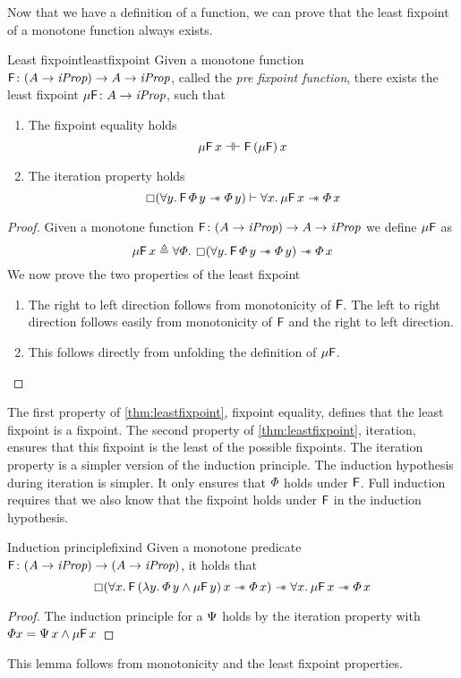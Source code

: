 \documentclass[thesis.tex]{subfiles}
\begin{document}
Now that we have a definition of a function, we can prove that the least fixpoint of a monotone function always exists.
\begin{theorem}{Least fixpoint}{leastfixpoint}
    Given a monotone function $\textsf{\upshape F}\colon (A \to \textit{iProp}) \to  A \to \textit{iProp}$, called the \emph{pre fixpoint function}, there exists the least fixpoint $\mu\textsf{\upshape F}\colon  A \to \textit{iProp}$, such that
    \begin{enumerate}
        \item The fixpoint equality holds
              \[ \mu\textsf{\upshape F}\, x \mathrel{\dashv\vdash} \textsf{\upshape F}\, (\mu\textsf{\upshape F})\, x \]
        \item The iteration property holds
              \[ \always (\All \varB. \hopred\, \pred\, \varB \wand \pred\, \varB) \proves \All \var. \lfp\hopred\, \var \wand \pred\, \var \]
    \end{enumerate}
\end{theorem}
\begin{proof}
    Given a monotone function $\textsf{\upshape F}\colon (A \to \textit{iProp}) \to  A \to \textit{iProp}$ we define $\mu\textsf{\upshape F}$ as
    \[ \lfp\hopred\, \var \eqdef \All \pred. \always(\All \varB. \hopred\, \pred\, \varB \wand \pred\, \varB) \wand \pred \, \var \]
    We now prove the two properties of the least fixpoint
    \begin{enumerate}
        \item The right to left direction follows from monotonicity of $\textsf{\upshape F}$. The left to right direction follows easily from monotonicity of $\textsf{\upshape F}$ and the right to left direction.
        \item This follows directly from unfolding the definition of $\mu\textsf{\upshape F}$. \qedhere
    \end{enumerate}
\end{proof}
\noindent The first property of \cref{thm:leastfixpoint}, fixpoint equality, defines that the least fixpoint is a fixpoint. The second property of \cref{thm:leastfixpoint}, iteration, ensures that this fixpoint is the least of the possible fixpoints. The iteration property is a simpler version of the induction principle. The induction hypothesis during iteration is simpler. It only ensures that $\varPhi$ holds under $\textsf{\upshape F}$. Full induction requires that we also know that the fixpoint holds under $\textsf{\upshape F}$ in the induction hypothesis.
\begin{lemma}{Induction principle}{fixind}
    Given a monotone predicate $\textsf{\upshape F}\colon (A \to \textit{iProp}) \to (A \to \textit{iProp})$, it holds that
    \[\always(\All\var.\hopred\,(\Lam\varB. \pred\,\varB \land \lfp\hopred\,\varB)\,\var \wand \pred\,\var) \wand \All\var. \lfp\hopred\,\var \wand \pred\,\var\]
\end{lemma}
\begin{proof}
    The induction principle for a $\Psi$ holds by the iteration property with $\varPhi x = \Psi\, x \land \mu\textsf{\upshape F}\, x$
\end{proof}
This lemma follows from monotonicity and the least fixpoint properties.
\end{document}

